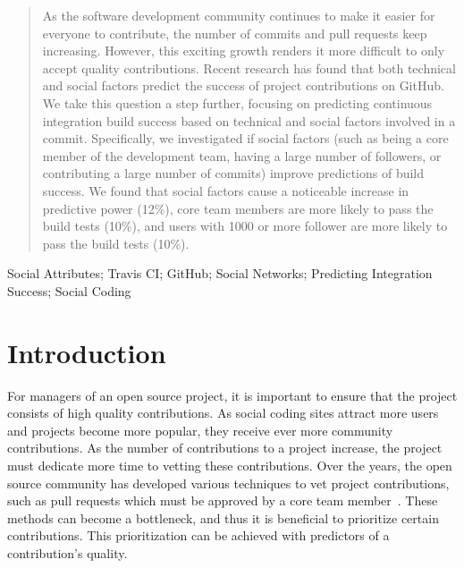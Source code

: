 \documentclass[10pt, conference]{IEEEtran}
\begin{document}




\maketitle


\begin{abstract}
As the software development community continues to make it easier for everyone
to contribute, the number of commits and pull requests keep increasing. However, this exciting growth
renders it more difficult to only accept quality contributions.
Recent research has found 
that both technical and social factors predict
the success of project contributions on GitHub.  
We take this question a step further, focusing on predicting continuous
integration build success based on technical and
social factors involved in a commit.
Specifically, we investigated if social factors (such as being a
core member of the development team, having a large number of followers,
or contributing a large number of commits) improve predictions of build
success.  We found that social factors cause a noticeable increase
in predictive power (12\%), core team members are more likely to pass the build
tests (10\%), and users with 1000 or more follower are more likely to
pass the build tests (10\%).
\end{abstract}

\begin{IEEEkeywords}
Social Attributes; Travis CI; GitHub; Social Networks; Predicting Integration 
Success; Social Coding
\end{IEEEkeywords}


%
\IEEEpeerreviewmaketitle



\section{Introduction}
For managers of an open source project, it is important to ensure that the
project consists of high quality contributions.  As social coding sites attract
more users and projects become more popular, they receive ever more
community contributions.  As the number of contributions to a project increase,
the project must dedicate more time to vetting these contributions. 
%
Over the years, the open source
community has developed various techniques to vet project contributions, such as pull
requests which must be approved by a core team member~\cite{gousios14}. 
These methods can become a bottleneck, and thus it is beneficial to prioritize certain
contributions.  This prioritization can be achieved with predictors of a
contribution's quality.
\end{document}
